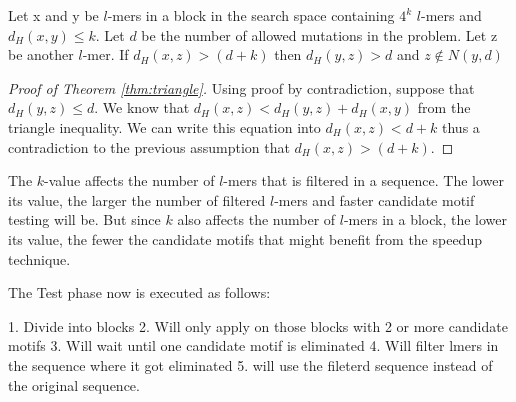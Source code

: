 \begin{thm} \label{thm:triangle}
	Let x and y be $l$-mers in a block in the search space containing $4^k$ $l$-mers and $d_H(x, y) \leq k$. Let $d$ be the number of allowed mutations in the problem. Let z be another $l$-mer. If $d_H(x, z) > (d + k)$ then $d_H(y, z) > d$ and $z \not\in N(y, d)$
\end{thm}

\begin{proof}[Proof of Theorem \ref{thm:triangle}]
Using proof by contradiction, suppose that $d_H(y, z) \leq d$. We know that $d_H(x, z) < d_H(y, z) + d_H(x, y)$ from the triangle inequality. We can write this equation into $d_H(x, z) < d + k$ thus a contradiction to the previous assumption that $d_H(x, z) > (d + k)$.
\end{proof}

The $k$-value affects the number of $l$-mers that is filtered in a sequence. The lower its value, the larger the number of filtered $l$-mers and faster candidate motif testing will be. But since $k$ also affects the number of $l$-mers in a block, the lower its value, the fewer the candidate motifs that might benefit from the speedup technique.

The Test phase now is executed as follows:

\itemize{}

1. Divide into blocks
2. Will only apply on those blocks with 2 or more candidate motifs
3. Will wait until one candidate motif is eliminated
4. Will filter lmers in the sequence where it got eliminated
5. will use the fileterd sequence instead of the original sequence.